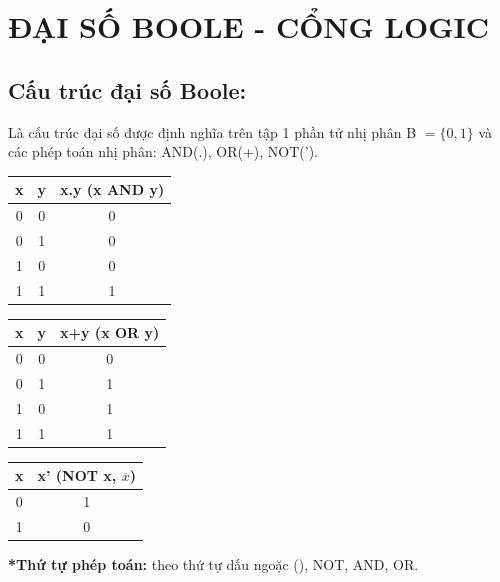 \section{ĐẠI SỐ BOOLE - CỔNG LOGIC}
\subsection{Cấu trúc đại số Boole:}
Là cấu trúc đại số được định nghĩa trên tập 1 phần tử nhị phân B $=\lbrace 0,1\rbrace$ và các phép toán nhị phân: AND(.), OR(+), NOT(').
\begin{table}[h!]
    \centering
    \begin{tabular}{|cc|c|}
    \hline
    \textbf{x} & \textbf{y} & \textbf{x.y (x AND y)} \\ \hline
    0          & 0          & 0                      \\ 
    0          & 1          & 0                      \\ 
    1          & 0          & 0                      \\ 
    1          & 1          & 1                      \\ \hline
    \end{tabular}
    \qquad \qquad
    \begin{tabular}{|cc|c|}
    \hline
    \textbf{x} & \textbf{y} & \textbf{x+y (x OR y)} \\ \hline
    0          & 0          & 0                     \\ 
    0          & 1          & 1                     \\ 
    1          & 0          & 1                     \\ 
    1          & 1          & 1                     \\ \hline
    \end{tabular}
\end{table}
\begin{table}[h!]
    \centering
    \begin{tabular}{|c|c|}
    \hline
    \textbf{x} & \textbf{x' (NOT x, $\overline{x}$)} \\ \hline
    0          & 1                                   \\ 
    1          & 0                                   \\ \hline
    \end{tabular}
\end{table}

\textbf{*Thứ tự phép toán:} theo thứ tự dấu ngoặc (), NOT, AND, OR.
